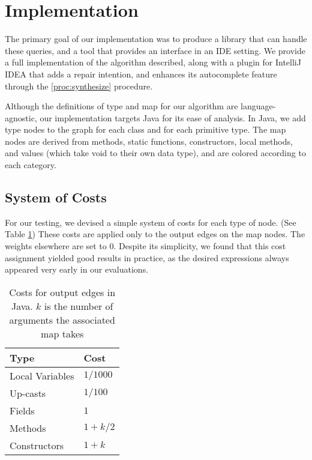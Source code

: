 \section{Implementation}
\label{sec:implementation}

The primary goal of our implementation was to produce a library that can handle these queries, and a tool that provides an interface in an IDE setting. We provide a full implementation of the algorithm described, along with a plugin for IntelliJ IDEA that adds a repair intention, and enhances its autocomplete feature through the \ref{proc:synthesize} procedure.

Although the definitions of type and map for our algorithm are language-agnostic, our implementation targets Java for its ease of analysis. In Java, we add type nodes to the graph for each class and for each primitive type. The map nodes are derived from methods, static functions, constructors, local methods, and values (which take void to their own data type), and are colored according to each category.

\subsection{System of Costs}
For our testing, we devised a simple system of costs for each type of node. (See Table \ref{impl:costs}) These costs are applied only to the output edges on the map nodes. The weights elsewhere are set to $0$. Despite its simplicity, we found that this cost assignment yielded good results in practice, as the desired expressions always appeared very early in our evaluations.

\begin{table}[h]
  \centering
  \renewcommand{\arraystretch}{1.25}
  \begin{tabularx}{0.75\linewidth}{| X | X |}
    \hline
    \textbf{Type} & \textbf{Cost} \\ \hline
	Local Variables & $1/1000$ \\ \hline
    Up-casts & $1/100$ \\ \hline
    Fields  & $1$ \\ \hline
    Methods & $1 + k / 2$ \\ \hline
    Constructors & $1 + k$ \\ \hline
  \end{tabularx}
  \caption{Costs for output edges in Java. $k$ is the number of arguments the associated map takes}
  \label{impl:costs}
\end{table}

